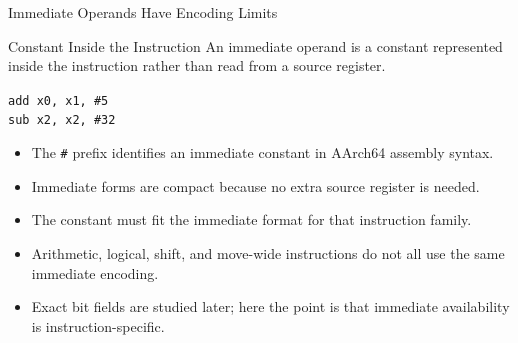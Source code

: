 \documentclass[aspectratio=169,11pt,t]{beamer}
\newcommand{\code}[1]{\texttt{#1}}
\begin{document}



\begin{frame}{Immediate Operands Have Encoding Limits}
\begin{block}{Constant Inside the Instruction}
An immediate operand is a constant represented inside the instruction rather than read from a source register.
\end{block}
\vspace{0.12cm}
\large
\hspace{3.1cm}\code{add x0, x1, \#5}\\[0.10cm]
\hspace{3.1cm}\code{sub x2, x2, \#32}
\normalsize
\vspace{0.18cm}
\begin{itemize}
\item The \code{\#} prefix identifies an immediate constant in AArch64 assembly syntax.
\item Immediate forms are compact because no extra source register is needed.
\item The constant must fit the immediate format for that instruction family.
\item Arithmetic, logical, shift, and move-wide instructions do not all use the same immediate encoding.
\item Exact bit fields are studied later; here the point is that immediate availability is instruction-specific.
\end{itemize}
\end{frame}









\end{document}
